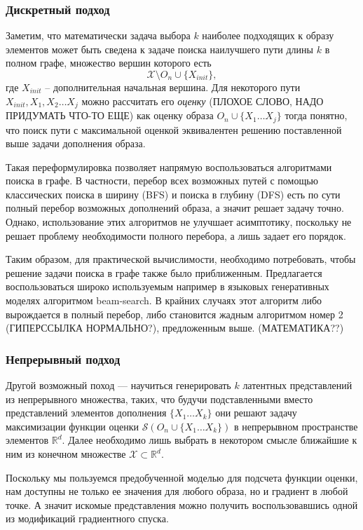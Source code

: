 \documentclass[a4paper,12pt]{article}
\begin{document}
			\subsubsection{Дискретный подход}
			Заметим, что математически задача выбора $k$ наиболее подходящих к образу элементов может быть сведена к задаче поиска наилучшего пути длины $k$ в полном графе, множество вершин которого есть 
			$$\mathcal{X}\setminus O_n \cup \{X_{init}\},$$ где $X_{init}$ -- дополнительная начальная вершина. Для некоторого пути $X_{init}, X_1, X_2\dots X_j$ можно рассчитать его \textit{оценку} (ПЛОХОЕ СЛОВО, НАДО ПРИДУМАТЬ ЧТО-ТО ЕЩЕ) как оценку образа $O_n\cup\{X_1\dots X_j\}$ тогда понятно, что поиск пути с максимальной оценкой эквивалентен решению поставленной выше задачи дополнения образа. 
			
			Такая переформулировка позволяет напрямую воспользоваться алгоритмами поиска в графе. В частности, перебор всех возможных путей с помощью классических поиска в ширину (BFS) и поиска в глубину (DFS) есть по сути полный перебор возможных дополнений образа, а значит решает задачу точно. Однако, использование этих алгоритмов не улучшает асимптотику, поскольку не решает проблему необходимости полного перебора, а лишь задает его порядок. 
			
			Таким образом, для практической вычислимости, необходимо потребовать, чтобы решение задачи поиска в графе также было приближенным. Предлагается воспользоваться широко используемым например в языковых генеративных моделях алгоритмом beam-search. В крайних случаях этот алгоритм либо вырождается в полный перебор, либо становится жадным алгоритмом номер 2 (ГИПЕРССЫЛКА НОРМАЛЬНО?), предложенным выше. (МАТЕМАТИКА??)
			
			\subsubsection{Непрерывный подход}
			Другой возможный поход --- научиться генерировать $k$ латентных представлений из непрерывного множества, таких, что будучи подставленными вместо представлений элементов дополнения $\{X_1\dots X_k\}$ они решают задачу максимизации функции оценки $\mathcal{S}(O_n \cup \{X_1\dots X_k\})$ в непрерывном пространстве элементов $\mathbb{R}^d$. Далее необходимо лишь выбрать в некотором смысле ближайшие к ним из конечном множестве $\mathcal{X}\subset \mathbb{R}^d$. 
			
			Поскольку мы пользуемся предобученной моделью для подсчета функции оценки, нам доступны не только ее значения для любого образа, но и градиент в любой точке. А значит искомые представления можно получить воспользовавшись одной из модификаций градиентного спуска. \\
			
			
	
	
			
	 
\end{document}

